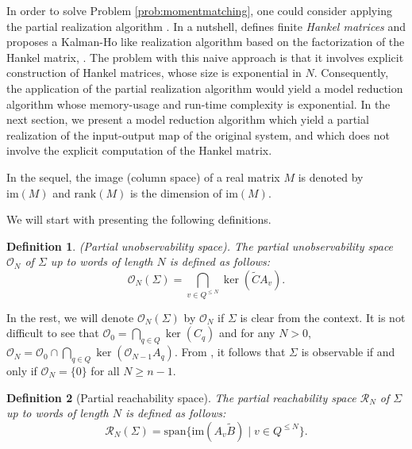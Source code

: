 \documentclass[journal]{IEEEtran}
\newcommand{\IM}{\mathrm{im}}
\newcommand{\Rank}{\mathrm{rank}}
\newcommand{\SPAN}{\mathrm{span}}
\newtheorem{Definition}{Definition}
\begin{document}
In order to solve Problem \ref{prob:momentmatching}, one could consider applying the partial realization algorithm \cite{petreczky}. In a nutshell, \cite{petreczky} defines finite \emph{Hankel matrices} and proposes a Kalman-Ho like realization algorithm based on the factorization of the Hankel matrix, \cite[Algorithm 1]{petreczky}. The problem with this naive approach is that it involves explicit construction of Hankel matrices, whose size is exponential in $N$. Consequently, the application of the partial realization algorithm would yield a model reduction algorithm whose memory-usage and run-time complexity is exponential. In the next section, we present a model reduction algorithm which yield a partial realization of the input-output map of the original system, and which does not involve the explicit computation of the Hankel matrix.





In the sequel, the image (column space) of a real matrix $M$ is denoted by $\IM (M)$ and $\Rank (M)$ is the dimension of $\IM (M)$. 



We will start with presenting the following definitions.

\begin{Definition} \label{ObservabilityMat}
	\emph{(Partial unobservability space).}
The partial unobservability space $\mathscr{O}_N$ of $\Sigma$ up to words of length $N$ is defined as follows:
	\begin{equation}
		\mathscr{O}_N(\Sigma)= \bigcap_{v \in Q^{\leq N}} \ker(\widetilde{C}A_v).
	\end{equation}
\end{Definition}

In the rest, we will denote $\mathscr{O}_N(\Sigma)$ by $\mathscr{O}_N$ if $\Sigma$ is clear from the context. It is not difficult to see that $\mathscr{O}_0=\bigcap_{q \in Q} \ker (C_q)$ and for any $N > 0$, $\mathscr{O}_{N}=\mathscr{O}_{0} \cap \bigcap_{q \in Q} \ker (\mathscr{O}_{N-1}A_q)$. From \cite{Sun:Book,MP:BigArticlePartI}, it follows that $\Sigma$ is observable if and only if $\mathscr{O}_{N}=\{0\}$ for all $N \ge n-1$.

\begin{Definition}[Partial reachability space] \label{ReachabilityMat}
The partial reachability space $\mathscr{R}_N$ of $\Sigma$ up to words of length $N$ is defined as follows:
	\begin{equation}
		\mathscr{R}_N(\Sigma)= \SPAN \{ \IM(A_v \widetilde{B}) \mid v \in Q^{\leq N} \}.
	\end{equation}
\end{Definition}
\end{document}
